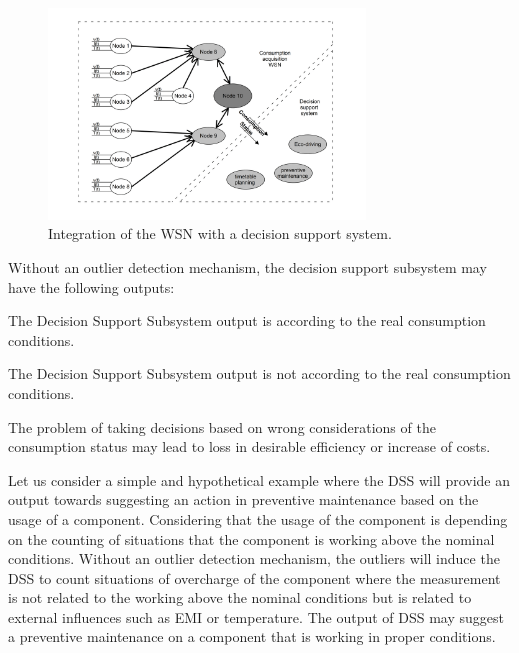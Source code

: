 \begin{figure}[h!]
	\centering
	\includegraphics[width=0.75\textwidth,keepaspectratio]{figures/general}
	\caption{Integration of the WSN with a decision support system. }
	\label{fig:general}
\end{figure}

\newpage
Without an outlier detection mechanism, the decision support subsystem may have the following outputs:


\begin{description}
	\setlength\itemsep{-0.5em}
	\item[Input deviation from real value lower than a threshold]
	The Decision Support Subsystem output is according to the real consumption conditions.
	\item[Input deviation from real value greater than a threshold]
	The Decision Support Subsystem output is not according to the real consumption conditions.	
\end{description}

The problem of taking decisions based on wrong considerations of the consumption status may lead to loss in desirable efficiency or increase of costs.

Let us consider a simple and hypothetical example where the DSS will provide an output towards suggesting an action in preventive maintenance based on the usage of a component. Considering that the usage of the component is depending on the counting of situations that the component is working above the nominal conditions. Without an outlier detection mechanism, the outliers will induce the DSS to count situations of overcharge of the component where the measurement is not related to the working above the nominal conditions but is related to external influences such as EMI or temperature. The output of DSS may suggest a preventive maintenance on a component that is working in proper conditions.

